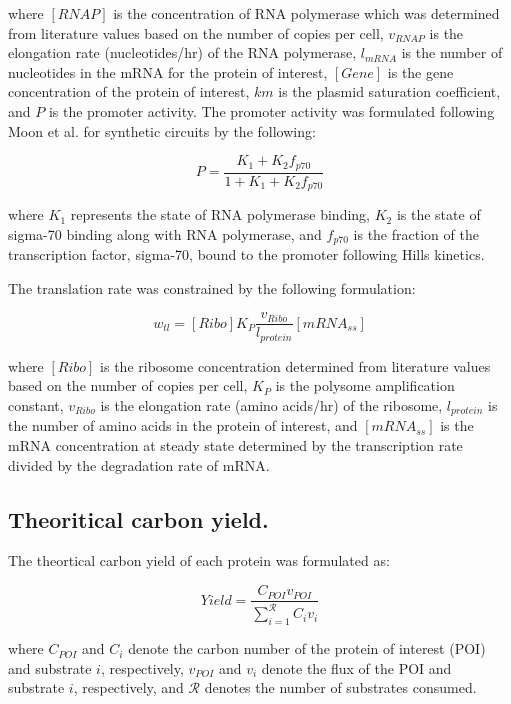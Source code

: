\documentclass[journal=asbcd6,manuscript=article]{achemso}
\begin{document}
where $[RNAP]$ is the concentration of RNA polymerase which was determined from literature values based on the number of copies per cell, $v_{RNAP}$ is the elongation rate (nucleotides/hr) of the RNA polymerase, $l_{mRNA}$ is the number of nucleotides in the mRNA for the protein of interest, $[Gene]$ is the gene concentration of the protein of interest, $km$ is the plasmid saturation coefficient, and $P$ is the promoter activity. 
The promoter activity was formulated following Moon et al. for synthetic circuits by the following:

\begin{equation}\nonumber
	P = \frac{K_{1}+K_{2}f_{p70}}{1 + K_{1}+K_{2}f_{p70}}
\end{equation}

where $K_{1}$ represents the state of RNA polymerase binding, $K_{2}$ is the state of sigma-70 binding along with RNA polymerase, and $f_{p70}$ is the fraction of the transcription factor, sigma-70, bound to the promoter following Hills kinetics. 

The translation rate was constrained by the following formulation:

 \begin{equation}\nonumber
	w_{tl} = [Ribo]K_{P}\frac{v_{Ribo}}{l_{protein}}[mRNA_{ss}]
\end{equation}

where $[Ribo]$ is the ribosome concentration determined from literature values based on the number of copies per cell, $K_{P}$ is the polysome amplification constant, $v_{Ribo}$ is the elongation rate (amino acids/hr) of the ribosome, $l_{protein}$ is the number of amino acids in the protein of interest, and $[mRNA_{ss}]$ is the mRNA concentration at steady state determined by the transcription rate divided by the degradation rate of mRNA.  

\subsection*{Theoritical carbon yield.}
The theortical carbon yield of each protein was formulated as:

\begin{equation}\nonumber
	Yield = \frac{C_{POI}v_{POI}}{\sum_{i = 1}^{\mathcal{R}}C_{i}v_{i}}
\end{equation}

where $C_{POI}$ and $C_{i}$ denote the carbon number of the protein of interest (POI) and substrate $i$, respectively, $v_{POI}$ and $v_{i}$ denote the flux of the POI and substrate $i$, respectively,
and $\mathcal{R}$ denotes the number of substrates consumed.
\end{document}
